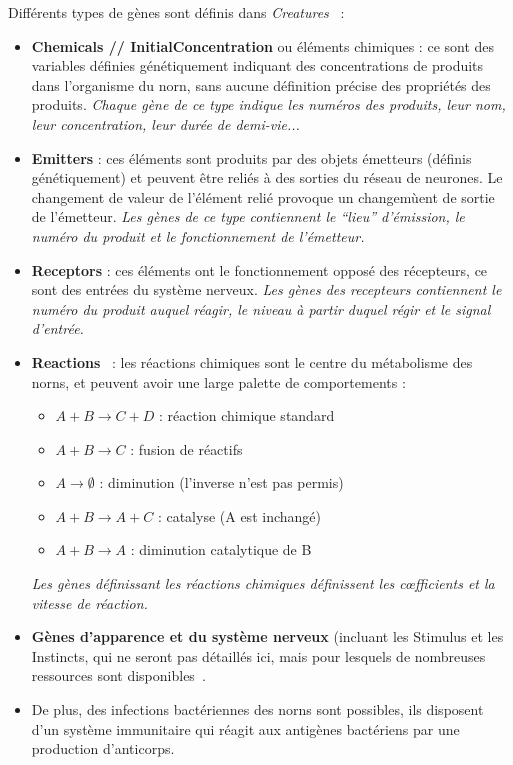 \documentclass[11pt,twoside,a4paper]{article}
\begin{document}
Diff{\'e}rents types de g{\`e}nes sont d{\'e}finis dans \textit{Creatures}~\cite{GraCli97} : 
\begin{itemize}
	\item \textbf{Chemicals // InitialConcentration} ou {\'e}l{\'e}ments chimiques : ce sont des variables d{\'e}finies g{\'e}n{\'e}tiquement indiquant des concentrations de produits dans l'organisme du norn, sans aucune d{\'e}finition pr{\'e}cise des propri{\'e}t{\'e}s des produits. \emph{Chaque g{\`e}ne de ce type indique les num{\'e}ros des produits, leur nom, leur concentration, leur dur{\'e}e de demi-vie... }
	\item \textbf{Emitters} : ces {\'e}l{\'e}ments sont produits par des objets {\'e}metteurs (d{\'e}finis g{\'e}n{\'e}tiquement) et peuvent {\^e}tre reli{\'e}s {\`a} des sorties du r{\'e}seau de neurones. Le changement de valeur de l'{\'e}l{\'e}ment reli{\'e} provoque un changem{\`u}ent de sortie de l'{\'e}metteur. \emph{Les g{\`e}nes de ce type contiennent le ``lieu'' d'{\'e}mission, le num{\'e}ro du produit et le fonctionnement de l'{\'e}metteur. }
	\item \textbf{Receptors} : ces {\'e}l{\'e}ments ont le fonctionnement oppos{\'e} des r{\'e}cepteurs, ce sont des entr{\'e}es du syst{\`e}me nerveux. \emph{Les g{\`e}nes des recepteurs contiennent le num{\'e}ro du produit auquel r{\'e}agir, le niveau {\`a} partir duquel r{\'e}gir et le signal d'entr{\'e}e. }
	\item \textbf{Reactions}~\label{creatures:reactions} : les r{\'e}actions chimiques sont le centre du m{\'e}tabolisme des norns, et peuvent avoir une large palette de comportements :  
	\begin{itemize}
		\item $A + B \rightarrow C + D$ : r{\'e}action chimique standard
		\item $A + B \rightarrow C$ : fusion de r{\'e}actifs
		\item $A \rightarrow \emptyset$ : diminution (l'inverse n'est pas permis)
		\item $A + B \rightarrow A + C$ : catalyse (A est inchang{\'e})
		\item $A + B \rightarrow A$ : diminution catalytique de B
	\end{itemize}
	\emph{Les g{\`e}nes d{\'e}finissant les r{\'e}actions chimiques d{\'e}finissent les c\oe fficients et la vitesse de r{\'e}action. }
	\item \textbf{G{\`e}nes d'apparence et du syst{\`e}me nerveux} (incluant les Stimulus et les Instincts, qui ne seront pas d{\'e}taill{\'e}s ici, mais pour lesquels de nombreuses ressources sont disponibles~\cite{CliGra99,GraCli97,GraCli98,GrClMa96,GrClMa97}.
	\item De plus, des infections bact{\'e}riennes des norns sont possibles, ils disposent d'un syst{\`e}me immunitaire qui r{\'e}agit aux antig{\`e}nes bact{\'e}riens par une production d'anticorps.
\end{itemize}
\end{document}
